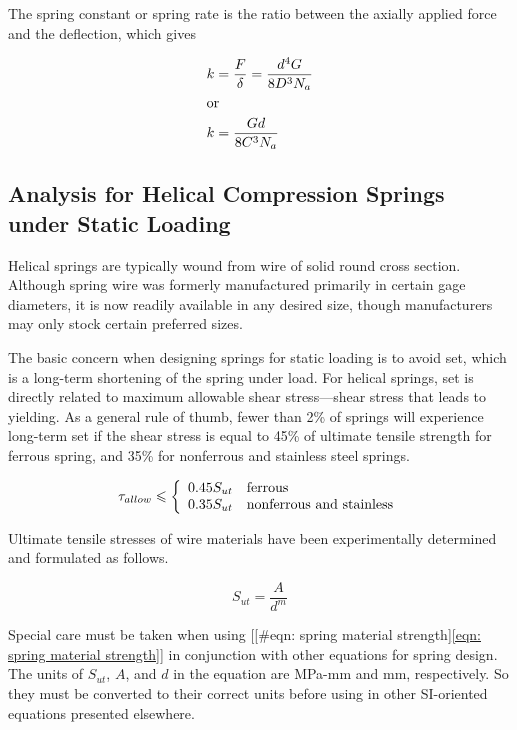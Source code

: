 \documentclass[a4paper,openany,12pt]{book}
\begin{document}
{{The spring constant or spring rate is the ratio between the axially
applied force and the deflection, which gives

\begin{gather}
\label{eqn: spring constant}
  k = \frac{F}{\delta} = \frac{d^4G}{8D^3N_a} \hfill \\
  \text{or} \hfill \\
  k = \frac{Gd}{8C^3N_a} \hfill \\ 
\end{gather}

\subsection{Analysis for Helical Compression Springs under Static Loading}
\label{analysis-for-helical-compression-springs-under-static-loading}
Helical springs are typically wound from wire of solid round cross
section. Although spring wire was formerly manufactured primarily in
certain gage diameters, it is now readily available in any desired size,
though manufacturers may only stock certain preferred sizes.

The basic concern when designing springs for static loading is to avoid
set, which is a long-term shortening of the spring under load. For
helical springs, set is directly related to maximum allowable shear
stress---shear stress that leads to yielding. As a general rule of
thumb, fewer than 2\% of springs will experience long-term set if the
shear stress is equal to 45\% of ultimate tensile strength for ferrous
spring, and 35\% for nonferrous and stainless steel springs.

$$\tau_{allow} \leqslant \left\{
    \begin{array}{ll}
       0.45 S_{ut} & \text{ferrous} \hfill \\ 
       0.35 S_{ut} & \text{nonferrous and stainless} 
     \end{array} \right.$$

Ultimate tensile stresses of wire materials have been experimentally
determined and formulated as follows.

$$S_{ut} = \frac{A}{d^m}$$

Special care must be taken when using
[[\#eqn: spring material strength]\ref{eqn: spring material strength}] in
conjunction with other equations for spring design. The units of
\(S_{ut}\), \(A\), and \(d\) in the equation are MPa-mm and mm, respectively.
So they must be converted to their correct units before using in other
SI-oriented equations presented elsewhere.

}}
\end{document}
